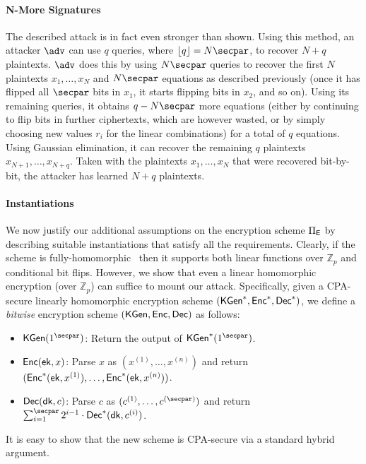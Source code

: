 \paragraph{N-More Signatures} 
The described attack is in fact even stronger than shown. Using this method, an attacker $\adv$ can use $q$ queries, where $\lfloor{q}\rfloor=N\secpar$, to recover $N+q$ plaintexts. $\adv$ does this by using $N\secpar$ queries to recover the first $N$ plaintexts $x_1, \ldots, x_N$ and $N\secpar$ equations as described previously (once it has flipped all $\secpar$ bits in $x_1$, it starts flipping bits in $x_2$, and so on). Using its remaining queries, it obtains $q-N\secpar$ more equations (either by continuing to flip bits in further ciphertexts, which are however wasted, or by simply choosing new values $r_i$ for the linear combinations) for a total of $q$ equations. Using Gaussian elimination, it can recover the remaining $q$ plaintexts $x_{N+1},\ldots,x_{N+q}$. Taken with the plaintexts $x_1,\ldots,x_N$ that were recovered bit-by-bit, the attacker has learned $N+q$ plaintexts.

\paragraph{Instantiations} 
We now justify our additional assumptions on the encryption scheme $\Pi_{\mathsf{E}}$ by describing suitable instantiations that satisfy all the requirements. Clearly, if the scheme is fully-homomorphic~\cite{STOC:Gentry09} then it supports both linear functions over $\mathbb{Z}_p$ and conditional bit flips. However, we show that even a linear homomorphic encryption (over $\mathbb{Z}_p$) can suffice to mount our attack. Specifically, given a CPA-secure linearly homomorphic encryption scheme $({\mathsf{KGen}}^*,{\mathsf{Enc}}^*,{\mathsf{Dec}}^*)$,  we define a \emph{bitwise} encryption scheme $({\mathsf{KGen}},{\mathsf{Enc}},{\mathsf{Dec}})$ as follows:

\begin{itemize}
    \item $\kgen(1^\secpar)$: Return the output of $\kgen^*(1^\secpar)$.
    \item ${\mathsf{Enc}}(\mathsf{ek},x)$: Parse $x$ as $(x^{(1)},\ldots,x^{(n)})$ and return $({\mathsf{Enc}}^*(\mathsf{ek},x^{(1)}),\ldots,\allowbreak {\mathsf{Enc}}^*(\mathsf{ek},x^{(n)}))$.
    \item ${\mathsf{Dec}}(\mathsf{dk},c)$: Parse $c$ as $(c^{(1)},\ldots,c^{(\secpar)})$ and return $\sum_{i=1}^{\secpar} 2^{i-1} \cdot \dec^*(\dk,c^{(i)})$.
\end{itemize}
%
It is easy to show that the new scheme is CPA-secure via a standard hybrid argument. 


